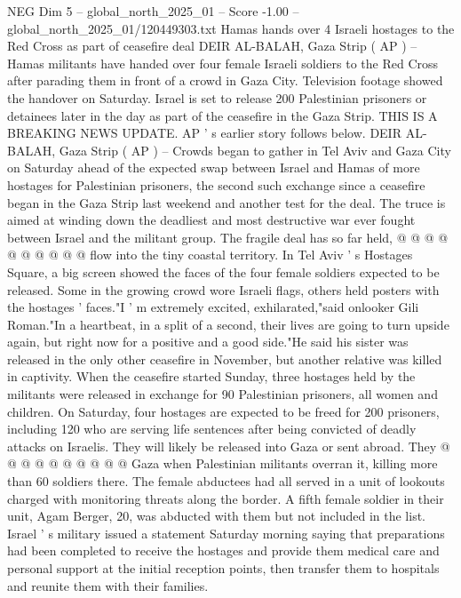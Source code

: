 \begin{textsample}{NEG Dim 5 – global\_north\_2025\_01 – Score -1.00 – global\_north\_2025\_01/120449303.txt}  \label{ex:f5_neg_182}
Hamas hands over 4 Israeli hostages to the Red Cross as part of ceasefire deal DEIR AL-BALAH, Gaza Strip ( AP ) -- Hamas militants have handed over four female Israeli soldiers to the Red Cross after parading them in front of a crowd in Gaza City.
Television footage showed the handover on Saturday.
Israel is set to release 200 Palestinian prisoners or detainees later in the day as part of the ceasefire in the Gaza Strip.
THIS IS A BREAKING NEWS UPDATE.
AP ' s earlier story follows below.
DEIR AL-BALAH, Gaza Strip ( AP ) -- Crowds began to gather in Tel Aviv and Gaza City on Saturday ahead of the expected swap between Israel and Hamas of more hostages for Palestinian prisoners, the second such exchange since a ceasefire began in the Gaza Strip last weekend and another test for the deal.
The truce is aimed at winding down the deadliest and most destructive war ever fought between Israel and the militant group.
The fragile deal has so far held, @ @ @ @ @ @ @ @ @ @ flow into the tiny coastal territory.
In Tel Aviv ' s Hostages Square, a big screen showed the faces of the four female soldiers expected to be released.
Some in the growing crowd wore Israeli flags, others held posters with the hostages ' faces."I ' m extremely excited, exhilarated,"said onlooker Gili Roman."In a heartbeat, in a split of a second, their lives are going to turn upside again, but right now for a positive and a good side."He said his sister was released in the only other ceasefire in November, but another relative was killed in captivity.
When the ceasefire started Sunday, three hostages held by the militants were released in exchange for 90 Palestinian prisoners, all women and children.
On Saturday, four hostages are expected to be freed for 200 prisoners, including 120 who are serving life sentences after being convicted of deadly attacks on Israelis.
They will likely be released into Gaza or sent abroad.
They @ @ @ @ @ @ @ @ @ @ Gaza when Palestinian militants overran it, killing more than 60 soldiers there.
The female abductees had all served in a unit of lookouts charged with monitoring threats along the border.
A fifth female soldier in their unit, Agam Berger, 20, was abducted with them but not included in the list.
Israel ' s military issued a statement Saturday morning saying that preparations had been completed to receive the hostages and provide them medical care and personal support at the initial reception points, then transfer them to hospitals and reunite them with their families.

\end{textsample}
